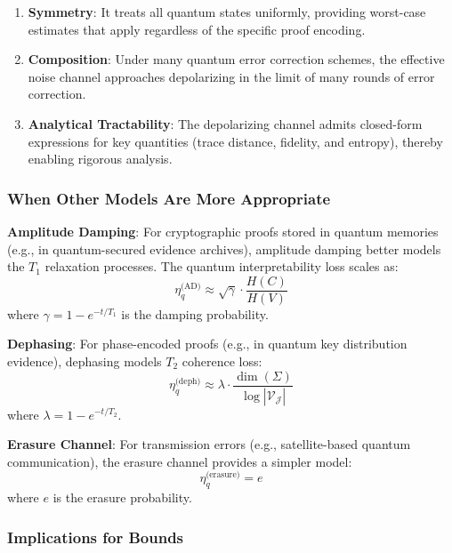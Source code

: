 \documentclass{ieeeaccess}
\begin{document}
\begin{enumerate}
    \item \textbf{Symmetry}: It treats all quantum states uniformly, providing worst-case estimates that apply regardless of the specific proof encoding.

    \item \textbf{Composition}: Under many quantum error correction schemes, the effective noise channel approaches depolarizing in the limit of many rounds of error correction.

    \item \textbf{Analytical Tractability}: The depolarizing channel admits closed-form expressions for key quantities (trace distance, fidelity, and entropy), thereby enabling rigorous analysis.
\end{enumerate}

\subsubsection{When Other Models Are More Appropriate}

\textbf{Amplitude Damping}: For cryptographic proofs stored in quantum memories (e.g., in quantum-secured evidence archives), amplitude damping better models the $T_1$ relaxation processes. The quantum interpretability loss scales as:
\begin{equation}
    \eta_q^{\text{(AD)}} \approx \sqrt{\gamma} \cdot \frac{H(C)}{H(V)}
\end{equation}
where $\gamma = 1 - e^{-t/T_1}$ is the damping probability.

\textbf{Dephasing}: For phase-encoded proofs (e.g., in quantum key distribution evidence), dephasing models $T_2$ coherence loss:
\begin{equation}
    \eta_q^{\text{(deph)}} \approx \lambda \cdot \frac{\dim(\Sigma)}{\log|\mathcal{V}_\mathcal{J}|}
\end{equation}
where $\lambda = 1 - e^{-t/T_2}$.

\textbf{Erasure Channel}: For transmission errors (e.g., satellite-based quantum communication), the erasure channel provides a simpler model:
\begin{equation}
    \eta_q^{\text{(erasure)}} = e
\end{equation}
where $e$ is the erasure probability.

\subsubsection{Implications for Bounds}
\end{document}
